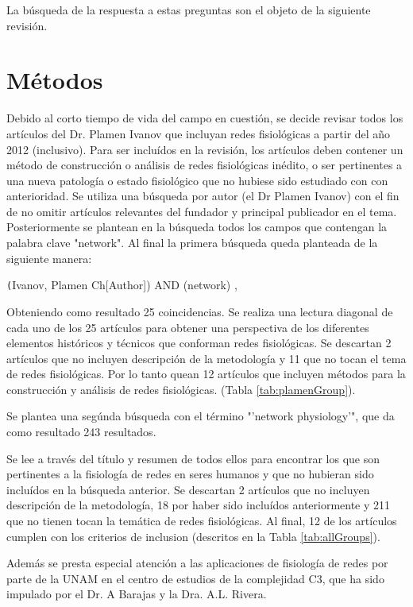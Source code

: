 \documentclass[twoside,twocolumn]{article}
\begin{document}
La búsqueda de la respuesta a estas preguntas son el objeto de la siguiente revisión.

\section{Métodos}
Debido al corto tiempo de vida del campo en cuestión, se decide revisar todos los artículos del Dr. Plamen Ivanov que incluyan redes fisiológicas a partir del año 2012 (inclusivo).
Para ser incluídos en la revisión, los artículos deben contener un método de construcción o análisis de redes fisiológicas inédito, o ser pertinentes a una nueva patología o estado fisiológico que no hubiese sido estudiado con con anterioridad.
Se utiliza una búsqueda por autor (el Dr Plamen Ivanov) con el fin de no omitir artículos relevantes del fundador y principal publicador en el tema. Posteriormente se plantean en la búsqueda todos los campos que contengan la palabra clave "network". Al final la primera búsqueda queda planteada de la siguiente manera:

\texttt(Ivanov, Plamen Ch[Author]) AND (network) ,

Obteniendo como resultado 25 coincidencias. Se realiza una lectura diagonal de cada uno de los 25 artículos para obtener una perspectiva de los diferentes elementos históricos y técnicos que conforman redes fisiológicas.
Se descartan 2 artículos que no incluyen descripción de la metodología y 11 que no tocan el tema de redes fisiológicas. Por lo tanto quean 12 artículos que incluyen métodos para la construcción y análisis de redes fisiológicas. (Tabla \ref{tab:plamenGroup}).

Se plantea una segúnda búsqueda con el término "'network physiology'", que da como resultado 243 resultados.

Se lee a través del título y resumen de todos ellos para  encontrar los que son pertinentes a la fisiología de redes en seres humanos y que no hubieran sido incluídos en la búsqueda anterior.
Se descartan 2 artículos que no incluyen descripción de la metodología, 18 por haber sido incluídos anteriormente y 211 que no tienen tocan la temática de redes fisiológicas.
Al final, 12 de los artículos cumplen con los criterios de inclusion (descritos en la Tabla \ref{tab:allGroups}).

Además se presta especial atención a las aplicaciones de fisiología de redes por parte de la UNAM en el centro de estudios de la complejidad C3, que ha sido impulado por el Dr. A Barajas y la Dra. A.L. Rivera.
\end{document}
